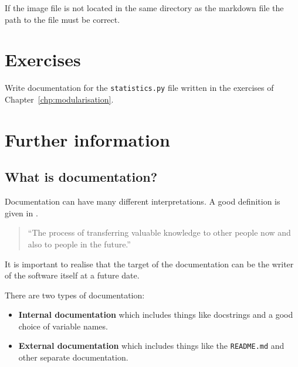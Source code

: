 \begin{note}

If the image file is not located in the same directory as the markdown file the
path to the file must be correct.
\end{note}




\section{Exercises}

Write documentation for the \texttt{statistics.py} file written in the exercises of
Chapter~\ref{chp:modularisation}.


\section{Further information}
\label{\detokenize{building-tools/06-documentation/why/main:further-information}}\label{\detokenize{building-tools/06-documentation/why/main:documentation-further-information}}\label{\detokenize{building-tools/06-documentation/why/main::doc}}

\subsection{What is documentation?}
\label{\detokenize{building-tools/06-documentation/why/main:what-is-documentation}}

Documentation can have many different interpretations. A good definition is
given in \cite{martraire2019living}.

\begin{quote}
``The process of transferring valuable knowledge to other people now and also to
people in the future.''
\end{quote}

\begin{note}
It is important to realise that the target of the documentation can be the
writer of the software itself at a future date.
\end{note}


There are two types of documentation:
\begin{itemize}
\item 

\textbf{Internal documentation} which includes things like docstrings and a good
choice of variable names.

\item 

\textbf{External documentation} which includes things like the \texttt{README.md} and other
separate documentation.

\end{itemize}



